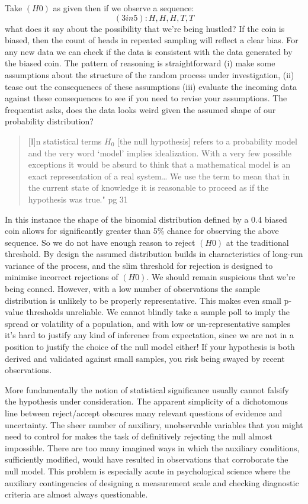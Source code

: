 \documentclass[]{tufte-book}
\theoremstyle{definition}
\theoremstyle{definition}
\theoremstyle{definition}
\theoremstyle{remark}
\begin{document}
Take \((H0)\) as given then if we observe a sequence: \[ (3in5): H, H, H, T, T\] what does it say about the possibility that we're being hustled? If the coin is biased, then the count of heads in repeated sampling will reflect a clear bias. For any new data we can check if the data is consistent with the data generated by the biased coin. The pattern of reasoning is straightforward (i) make some assumptions about the structure of the random process under investigation, (ii) tease out the consequences of these assumptions (iii) evaluate the incoming data against these consequences to see if you need to revise your assumptions. The frequentist asks, does the data looks weird given the assumed shape of our probability distribution?

\begin{quote}
{[}I{]}n statistical terms \(H_{0}\) {[}the null hypothesis{]} refers to a probability model and the very word `model' implies idealization. With a very few possible exceptions it would be absurd to think that a mathematical model is an exact representation of a real system\ldots{} We use the term to mean that in the current state of knowledge it is reasonable to proceed as if the hypothesis was true." pg 31 \citep{cox2006pos}
\end{quote}

In this instance the shape of the binomial distribution defined by a 0.4 biased coin allows for significantly greater than 5\% chance for observing the above sequence. So we do not have enough reason to reject \((H0)\) at the traditional threshold. By design the assumed distribution builds in characteristics of long-run variance of the process, and the slim threshold for rejection is designed to minimise incorrect rejections of \((H0)\). We should remain suspicious that we're being conned. However, with a low number of observations the sample distribution is unlikely to be properly representative. This makes even small p-value thresholds unreliable. We cannot blindly take a sample poll to imply the spread or volatility of a population, and with low or un-representative samples it's hard to justify any kind of inference from expectation, since we are not in a position to justify the choice of the null model either! If your hypothesis is both derived and validated against small samples, you risk being swayed by recent observations.

More fundamentally the notion of statistical significance usually cannot falsify the hypothesis under consideration. The apparent simplicity of a dichotomous line between reject/accept obscures many relevant questions of evidence and uncertainty. The sheer number of auxiliary, unobservable variables that you might need to control for makes the task of definitively rejecting the null almost impossible. There are too many imagined ways in which the auxiliary conditions, sufficiently modified, would have resulted in observations that corroborate the null model. This problem is especially acute in psychological science where the auxiliary contingencies of designing a measurement scale and checking diagnostic criteria are almost always questionable.
\end{document}
